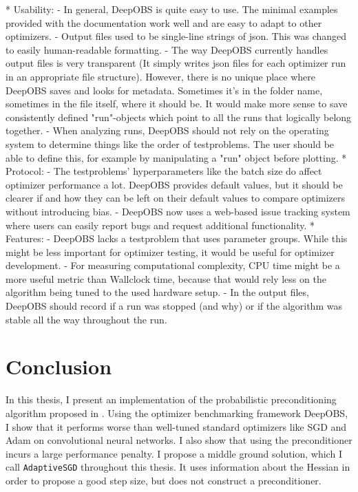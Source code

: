 \documentclass[twoside,12pt,a4paper]{report}
\begin{document}
\begin{markdown}
* Usability:
	- In general, DeepOBS is quite easy to use. The minimal examples provided with the documentation work well and are easy to adapt to other optimizers.
	- Output files used to be single-line strings of json. This was changed to easily human-readable formatting.
	- The way DeepOBS currently handles output files is very transparent (It simply writes json files for each optimizer run in an appropriate file structure). However, there is no unique place where DeepOBS saves and looks for metadata. Sometimes it's in the folder name, sometimes in the file itself, where it should be. It would make more sense to save consistently defined "run"-objects which point to all the runs that logically belong together.
	- When analyzing runs, DeepOBS should not rely on the operating system to determine things like the order of testproblems. The user should be able to define this, for example by manipulating a "run" object before plotting.
* Protocol: 
	- The testproblems' hyperparameters like the batch size do affect optimizer performance a lot. DeepOBS provides default values, but it should be clearer if and how they can be left on their default values to compare optimizers without introducing bias.
	- DeepOBS now uses a web-based issue tracking system where users can easily report bugs and request additional functionality.
* Features:
	- DeepOBS lacks a testproblem that uses parameter groups. While this might be less important for optimizer testing, it would be useful for optimizer development.
	- For measuring computational complexity, CPU time might be a more useful metric than Wallclock time, because that would rely less on the algorithm being tuned to the used hardware setup.
	- In the output files, DeepOBS should record if a run was stopped (and why) or if the algorithm was stable all the way throughout the run.
\end{markdown}

\chapter{Conclusion}
In this thesis, I present an implementation of the probabilistic preconditioning algorithm proposed in \cite{roos2019active}. Using the optimizer benchmarking framework DeepOBS,  I show that it performs worse than well-tuned standard optimizers like SGD and Adam on convolutional neural networks. I also show that using the preconditioner incurs a large performance penalty. I propose a middle ground solution, which I call \verb|AdaptiveSGD| throughout this thesis. It uses information about the Hessian in order to propose a good step size, but does not construct a preconditioner.
\end{document}
